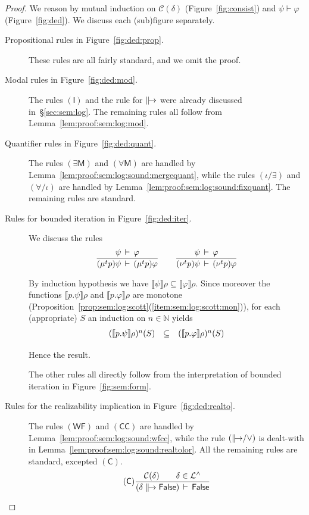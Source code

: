 \documentclass[%
  a4paper,
  UKenglish,
  cleveref,
  autoref,
  thm-restate,
  numberwithinsect,
]{lipics-v2021}
\newcommand\sle\subseteq
\newcommand\thesis{\vdash}
\newcommand\NN{\mathbb{N}}
\newcommand\I[1]{\llbracket #1 \rrbracket} %
\newcommand\SP{S}			%
\newcommand\ax[1]{(\mathsf{#1})}
\newcommand\C{\mathcal{C}}		%
\newcommand\temp[1]{\mathsf{#1}}
\newcommand\False{\temp{False}}
\newcommand\val{\rho}	%
\newcommand\defrealto{\mathrel\parallel\joinrel\to}
\newcommand\realto{\mathrel{\defrealto}}
\newcommand\FP{p}
\newcommand\finmu{\mu}
\newcommand\finnu{\nu}
\newcommand\fingen{\iota}
\newcommand\Lang{\mathcal{L}}
\begin{document}
\begin{proof}
We reason by mutual induction on $\C(\delta)$ (Figure~\ref{fig:consist})
and $\psi \thesis \varphi$ (Figure~\ref{fig:ded}).
We discuss each (sub)figure separately.
\begin{description}
\item[Propositional rules in Figure~\ref{fig:ded:prop}.]
These rules are all fairly standard, and we omit the proof.

\item[Modal rules in Figure~\ref{fig:ded:mod}.]
The rules $\ax{I}$ and the rule for $\realto$ were already
discussed in~\S\ref{sec:sem:log}.
The remaining rules all follow from Lemma~\ref{lem:proof:sem:log:mod}.

\item[Quantifier rules in Figure~\ref{fig:ded:quant}.]
The rules $\ax{\exists M}$ and $\ax{\forall M}$
are handled by Lemma~\ref{lem:proof:sem:log:sound:mergequant},
while the rules $(\fingen / \exists)$ and $(\forall / \fingen)$
are handled by Lemma~\ref{lem:proof:sem:log:sound:fixquant}.
The remaining rules are standard.

\item[Rules for bounded iteration in Figure~\ref{fig:ded:iter}.]
We discuss the rules
\[
\begin{array}{l l l}
%
\dfrac{\psi \,\thesis\, \varphi}
  {(\finmu^t \FP)\psi \,\thesis\, (\finmu^t \FP)\varphi}
%
\qquad
%
\dfrac{\psi \,\thesis\, \varphi}
  {(\finnu^t \FP)\psi \,\thesis\, (\finnu^t \FP)\varphi}
%
\end{array}
\]

\noindent
By induction hypothesis we have
$\I\psi\val \sle \I\varphi\val$.
Since moreover the functions
$\I{\FP.\psi}\val$ and $\I{\FP.\varphi}\val$
are monotone
(Proposition~\ref{prop:sem:log:scott}(\ref{item:sem:log:scott:mon})),
for each (appropriate) $\SP$ an induction on $n \in \NN$ yields
\[
\begin{array}{l l l}
  (\I{\FP.\psi}\val)^n(\SP)
& \sle
& (\I{\FP.\varphi}\val)^n(\SP)
\end{array}
\]

\noindent
Hence the result.

The other rules all directly follow from the interpretation
of bounded iteration in Figure~\ref{fig:sem:form}.

\item[Rules for the realizability implication in Figure~\ref{fig:ded:realto}.]
The rules $\ax{WF}$ and $\ax{CC}$ are handled by
Lemma~\ref{lem:proof:sem:log:sound:wfcc},
while the rule $\ax{{\realto}/\lor}$ is dealt-with
in Lemma~\ref{lem:proof:sem:log:sound:realtolor}.
%
All the remaining rules are standard, excepted $\ax{C}$.
\[
\ax{C}
\dfrac{\C(\delta)
  \qquad
  \delta \in \Lang^\land}
  {(\delta \realto \False) \,\thesis\, \False}
\]


\end{description}
\end{proof}
\end{document}
